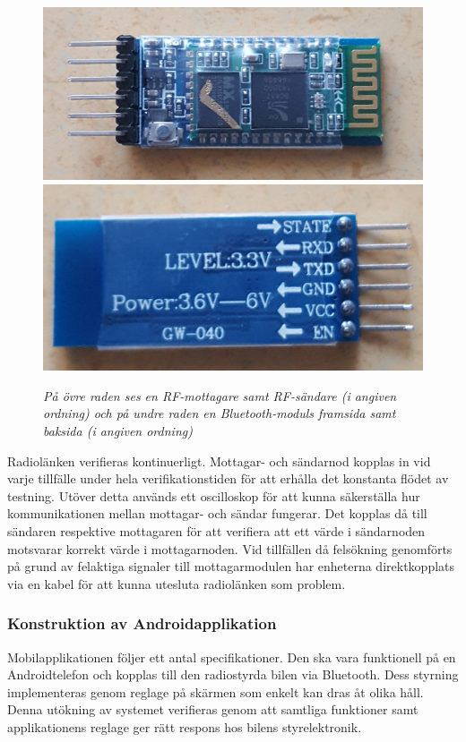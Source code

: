 \documentclass[a4paper]{article}
\begin{document}
\begin{figure}[H]
\includegraphics[scale=0.06]{BluetoothFront.jpg}
\includegraphics[scale=0.066]{BluetoothBack.jpg}
\caption{\it På övre raden ses en RF-mottagare samt RF-sändare (i angiven ordning) och på undre raden en Bluetooth-moduls framsida samt baksida (i angiven ordning)}
\end{figure}

\vspace{5mm} \noindent
Radiolänken verifieras kontinuerligt. Mottagar- och sändarnod kopplas in vid varje tillfälle under hela verifikationstiden för att erhålla det konstanta flödet av testning. Utöver detta används ett oscilloskop för att kunna säkerställa hur kommunikationen mellan mottagar- och sändar fungerar. Det kopplas då till sändaren respektive mottagaren för att verifiera att ett värde i sändarnoden motsvarar korrekt värde i mottagarnoden. Vid tillfällen då felsökning genomförts på grund av felaktiga signaler till mottagarmodulen har enheterna direktkopplats via en kabel för att kunna utesluta radiolänken som problem.


\subsubsection{Konstruktion av Androidapplikation}
Mobilapplikationen följer ett antal specifikationer. Den ska vara funktionell på en Androidtelefon och kopplas till den radiostyrda bilen via Bluetooth. Dess styrning implementeras genom reglage på skärmen som enkelt kan dras åt olika håll. Denna utökning av systemet verifieras genom att samtliga funktioner samt applikationens reglage ger rätt respons hos bilens styrelektronik.
\end{document}

